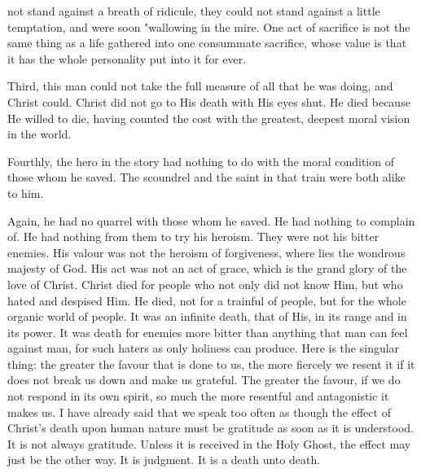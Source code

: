 \documentclass[12pt,letterpaper]{article}
\begin{document}
not stand against a breath of ridicule, they 
could not stand against a little temptation, and 
were soon "wallowing in the mire. One act of 
sacrifice is not the same thing as a life gathered 
into one consummate sacrifice, whose value is 
that it has the whole personality put into it 
for ever. 

Third, this man could not take the full 
measure of all that he was doing, and Christ 
could. Christ did not go to His death with 
His eyes shut. He died because He willed to 
die, having counted the cost with the greatest, 
deepest moral vision in the world. 

Fourthly, the hero in the story had nothing 
to do with the moral condition of those whom 
he saved. The scoundrel and the saint in that 
train were both alike to him. 

Again, he had no quarrel with those whom he 
saved. He had nothing to complain of. He had 
nothing from them to try his heroism. They 
were not his bitter enemies. His valour was 
not the heroism of forgiveness, where lies the 
wondrous majesty of God. His act was not 
an act of grace, which is the grand glory of 
the love of Christ. Christ died for people who 
not only did not know Him, but who hated and 
despised Him. He died, not for a trainful of 
people, but for the whole organic world of 
people. It was an infinite death, that of His, 
in its range and in its power. It was death 
for enemies more bitter than anything that 
man can feel against man, for such haters as 
only holiness can produce. Here is the singular 
thing: the greater the favour that is done to 
us, the more fiercely we resent it if it does not 
break us down and make us grateful. The 
greater the favour, if we do not respond in its 
own spirit, so much the more resentful and 
antagonistic it makes us. I have already said 
that we speak too often as though the effect 
of Christ's death upon human nature must be 
gratitude as soon as it is understood. It is 
not always gratitude. Unless it is received in 
the Holy Ghost, the effect may just be the 
other way. It is judgment. It is a death unto 
death. 
\end{document}
